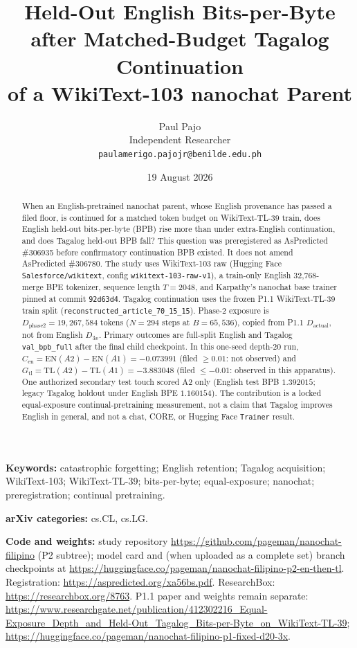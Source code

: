 \documentclass[11pt,a4paper]{article}
\title{Held-Out English Bits-per-Byte after Matched-Budget Tagalog Continuation\\of a WikiText-103 nanochat Parent}
\author{Paul Pajo\\
Independent Researcher\\
\texttt{paulamerigo.pajojr@benilde.edu.ph}}
\date{19 August 2026}
\begin{document}
\maketitle

\begin{abstract}
When an English-pretrained nanochat parent, whose English provenance has passed a filed floor, is continued for a matched token budget on WikiText-TL-39 train, does English held-out bits-per-byte (BPB) rise more than under extra-English continuation, and does Tagalog held-out BPB fall? This question was preregistered as AsPredicted \#306935 before confirmatory continuation BPB existed. It does not amend AsPredicted \#306780. The study uses WikiText-103 raw (Hugging Face \texttt{Salesforce/wikitext}, config \texttt{wikitext-103-raw-v1}), a train-only English 32{,}768-merge BPE tokenizer, sequence length $T=2048$, and Karpathy's nanochat base trainer pinned at commit \texttt{92d63d4}. Tagalog continuation uses the frozen P1.1 WikiText-TL-39 train split (\texttt{reconstructed\_article\_70\_15\_15}). Phase-2 exposure is $D_{\mathrm{phase2}}=19{,}267{,}584$ tokens ($N=294$ steps at $B=65{,}536$), copied from P1.1 $D_{\mathrm{actual}}$, not from English $D_{3x}$. Primary outcomes are full-split English and Tagalog \texttt{val\_bpb\_full} after the final child checkpoint. In this one-seed depth-20 run, $C_{\mathrm{en}}=\mathrm{EN}(A2)-\mathrm{EN}(A1)=-0.073991$ (filed $\ge 0.01$: not observed) and $G_{\mathrm{tl}}=\mathrm{TL}(A2)-\mathrm{TL}(A1)=-3.883048$ (filed $\le -0.01$: observed in this apparatus). One authorized secondary test touch scored A2 only (English test BPB $1.392015$; legacy Tagalog holdout under English BPE $1.160154$). The contribution is a locked equal-exposure continual-pretraining measurement, not a claim that Tagalog improves English in general, and not a chat, CORE, or Hugging Face \texttt{Trainer} result.
\end{abstract}

\noindent\textbf{Keywords:} catastrophic forgetting; English retention; Tagalog acquisition; WikiText-103; WikiText-TL-39; bits-per-byte; equal-exposure; nanochat; preregistration; continual pretraining.

\noindent\textbf{arXiv categories:} cs.CL, cs.LG.

\noindent\textbf{Code and weights:} study repository \url{https://github.com/pageman/nanochat-filipino} (P2 subtree); model card and (when uploaded as a complete set) branch checkpoints at \url{https://huggingface.co/pageman/nanochat-filipino-p2-en-then-tl}. Registration: \url{https://aspredicted.org/xa56bs.pdf}. ResearchBox: \url{https://researchbox.org/8763}. P1.1 paper and weights remain separate: \url{https://www.researchgate.net/publication/412302216_Equal-Exposure_Depth_and_Held-Out_Tagalog_Bits-per-Byte_on_WikiText-TL-39}; \url{https://huggingface.co/pageman/nanochat-filipino-p1-fixed-d20-3x}.
\end{document}
